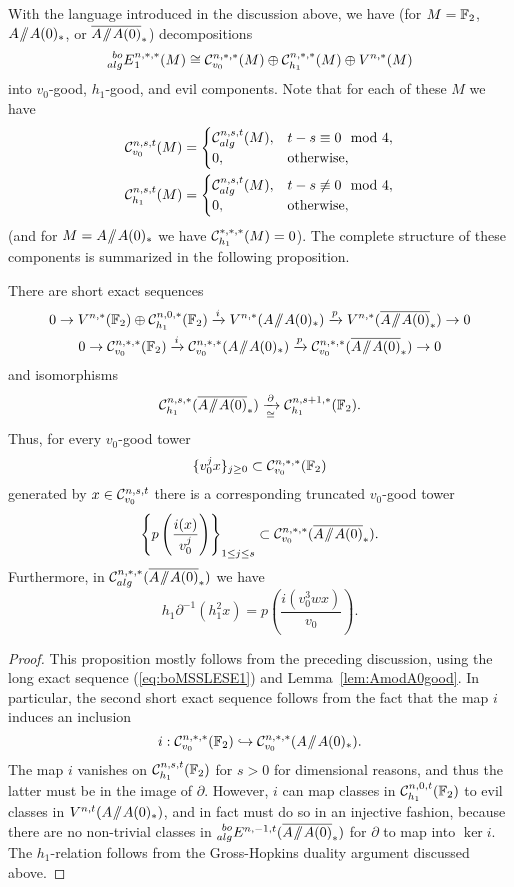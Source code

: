 With the language introduced in the discussion above, we have (for $M = \mathbb{F}_2$, $A \! \sslash \! A(0)_*$, or $\AA0$) decompositions
\[ \prescript{bo}{alg}{E}^{n,*,*}_1(M) \cong \mathcal{C}^{n,*,*}_{v_0}(M) \oplus \mathcal{C}^{n, *, *}_{h_1}(M) \oplus V^{n,*}(M) \]
into $v_0$-good, $h_1$-good, and evil components.  Note that for each of these $M$ we have
\begin{align*}
\mathcal{C}^{n,s,t}_{v_0}(M) & = 
\begin{cases}
\mathcal{C}^{n,s,t}_{alg}(M), & t-s \equiv 0 \mod 4, \\
0, & \mathrm{otherwise},
\end{cases}
\\
\mathcal{C}^{n,s,t}_{h_1}(M) & = 
\begin{cases}
\mathcal{C}^{n,s,t}_{alg}(M), & t-s \not\equiv 0 \mod 4, \\
0, & \mathrm{otherwise},
\end{cases}
\end{align*}
(and for $M = A \! \sslash \! A(0)_*$ we have $\mathcal{C}^{*,*,*}_{h_1}(M) = 0$).
The complete structure of these components is summarized in the following proposition.

\begin{prop}\label{prop:MSSSESE1}
There are short exact sequences
\begin{gather*}
 0 \rightarrow V^{n,*}(\FF_2) \oplus \mc{C}^{n,0,*}_{h_1}(\FF_2) \xrightarrow{i} V^{n,*}(A \mmod A(0)_*) \xrightarrow{p} V^{n,*}(\AA0) \rightarrow 0 \\
 0 \rightarrow \mc{C}^{n,*, *}_{v_0}(\FF_2) \xrightarrow{i} \mc{C}^{n, *,*}_{v_0}(A \mmod A(0)_*) \xrightarrow{p} \mc{C}^{n,*,*}_{v_0}(\AA0) \rightarrow 0
\end{gather*}
and isomorphisms
\[ \mc{C}_{h_1}^{n, s, *}(\AA0) \xrightarrow[\cong]{\partial} \mc{C}^{n, s+1, *}_{h_1}(\FF_2). \]
Thus, for every $v_0$-good tower
\[ \{ v_0^jx \}_{j \ge 0} \subset \mathcal{C}^{n, *, *}_{v_0}(\mathbb{F}_2) \]
generated by $x \in \mathcal{C}^{n, s, t}_{v_0}$
there is a corresponding truncated $v_0$-good tower
\[ \left\{ p\left(\frac{i(x)}{v_0^j}\right) \right\}_{1 \le j \le s} \subset \mathcal{C}^{n, *, *}_{v_0}(\overline{A\! \sslash \! A(0)}_*). \]
Furthermore, in $\mc{C}_{alg}^{n,*,*}(\AA0)$ we have
\[ h_1 \partial^{-1}(h_1^2 x) = p\left( \frac{i(v_0^3wx)}{v_0} \right). \]
\end{prop}

\begin{proof}
This proposition mostly follows from the preceding discussion, using the long exact sequence (\ref{eq:boMSSLESE1}) and Lemma~\ref{lem:AmodA0good}.
In particular, the second short exact sequence follows from the fact that the map $i$ induces an inclusion
$$ i : \mathcal{C}^{n,*,*}_{v_0}(\mathbb{F}_2) \hookrightarrow \mathcal{C}^{n, *,*}_{v_0}
(A \! \sslash \! A(0)_*). $$
The map $i$ vanishes on $\mathcal{C}^{n,s,t}_{h_1}(\mathbb{F}_2)$ for $s > 0$ for dimensional reasons, and thus the latter must be in the image of $\partial$.  However, $i$ can map classes in $\mathcal{C}^{n, 0, t}_{h_1}(\mathbb{F}_2)$ to evil classes in $V^{n,t}(A \! \sslash \! A(0)_*)$, and in fact must do so in an injective fashion, because there are no non-trivial classes in $\E{bo}{alg}^{n, -1, t}(\AA0)$ for $\partial$ to map into $\ker i$.  The $h_1$-relation follows from the Gross-Hopkins duality argument discussed above.
\end{proof}

